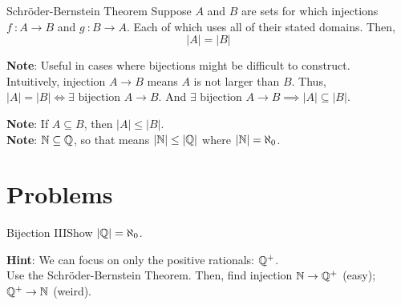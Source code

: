             \begin{ntheorem}
                {Schröder-Bernstein Theorem} Suppose \(A\) and \(B\) are sets for which injections \(f \ \colon A \rightarrow B\) and \(g \ \colon B \rightarrow A\). Each of which uses all of their stated domains. Then, \[|A| = |B|\]
            \end{ntheorem}

            \textbf{Note}: Useful in cases where bijections might be difficult to construct. \\

            Intuitively, injection \(A \rightarrow B\) means \(A\) is not larger than \(B\). Thus, \(|A| = |B| \iff \exists \text{ bijection } A \rightarrow B\). And \( \exists  \text{ bijection } A \rightarrow B \implies |A| \subseteq |B|\).
            

            \noindent \textbf{Note}: If \(A \subseteq B\), then \(|A| \leq |B|\). \\
            \textbf{Note}: \(\mathbb{N} \subseteq \mathbb{Q}\), so that means \(|\mathbb{N}| \leq |\mathbb{Q}|\) where \(|\mathbb{N}| = \aleph_0\).

        \section{Problems}


            \begin{exercise}
                {Bijection III}Show \(|\mathbb{Q}| = \aleph_0\).
            \end{exercise}
            \textbf{Hint}: We can focus on only the positive rationals: \(\mathbb{Q}^+\). \\
            Use the Schröder-Bernstein Theorem. Then, find injection \(\mathbb{N} \rightarrow \mathbb{Q}^+\) (easy); \(\mathbb{Q}^+ \rightarrow \mathbb{N}\) (weird).

